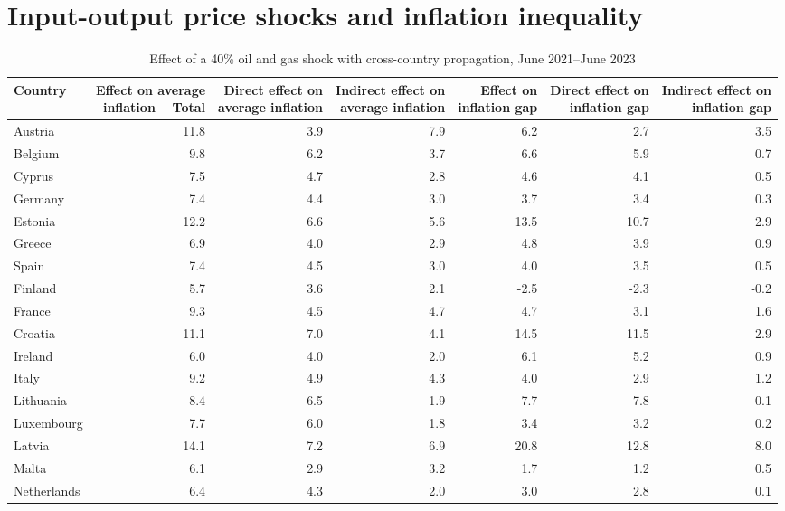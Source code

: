 \section*{Input-output price shocks and inflation inequality}
\begin{table}[H]
\centering
\caption{Effect of a 40\% oil and gas shock with cross-country propagation, June 2021--June 2023}
\label{tab:shock-oil-gas-chain-ea20}
\scriptsize
\setlength{\tabcolsep}{1.2pt}
\begin{tabular}{lrrrrrr}
\toprule
Country & \shortstack{Effect on average\\inflation -- Total} & \shortstack{Direct effect on\\average inflation} & \shortstack{Indirect effect on\\average inflation} & \shortstack{Effect on\\inflation gap} & \shortstack{Direct effect on\\inflation gap} & \shortstack{Indirect effect on\\inflation gap}
 \\
\midrule
Austria & 11.8 & 3.9 & 7.9 & 6.2 & 2.7 & 3.5
 \\
Belgium & 9.8 & 6.2 & 3.7 & 6.6 & 5.9 & 0.7
 \\
Cyprus & 7.5 & 4.7 & 2.8 & 4.6 & 4.1 & 0.5
 \\
Germany & 7.4 & 4.4 & 3.0 & 3.7 & 3.4 & 0.3
 \\
Estonia & 12.2 & 6.6 & 5.6 & 13.5 & 10.7 & 2.9
 \\
Greece & 6.9 & 4.0 & 2.9 & 4.8 & 3.9 & 0.9
 \\
Spain & 7.4 & 4.5 & 3.0 & 4.0 & 3.5 & 0.5
 \\
Finland & 5.7 & 3.6 & 2.1 & -2.5 & -2.3 & -0.2
 \\
France & 9.3 & 4.5 & 4.7 & 4.7 & 3.1 & 1.6
 \\
Croatia & 11.1 & 7.0 & 4.1 & 14.5 & 11.5 & 2.9
 \\
Ireland & 6.0 & 4.0 & 2.0 & 6.1 & 5.2 & 0.9
 \\
Italy & 9.2 & 4.9 & 4.3 & 4.0 & 2.9 & 1.2
 \\
Lithuania & 8.4 & 6.5 & 1.9 & 7.7 & 7.8 & -0.1
 \\
Luxembourg & 7.7 & 6.0 & 1.8 & 3.4 & 3.2 & 0.2
 \\
Latvia & 14.1 & 7.2 & 6.9 & 20.8 & 12.8 & 8.0
 \\
Malta & 6.1 & 2.9 & 3.2 & 1.7 & 1.2 & 0.5
 \\
Netherlands & 6.4 & 4.3 & 2.0 & 3.0 & 2.8 & 0.1

\end{tabular}
\end{table}
